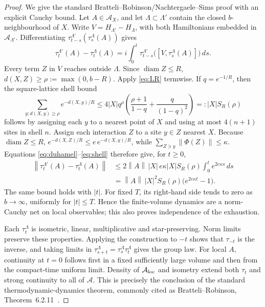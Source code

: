 \documentclass[11pt]{article}
\theoremstyle{remark}
\newcommand{\A}{\mathcal A}
\newcommand{\diam}{\operatorname{diam}}
\newcommand{\norm}[1]{\left\lVert#1\right\rVert}
\begin{document}
\begin{proof}
We give the standard Bratteli--Robinson/Nachtergaele--Sims proof with an
explicit Cauchy bound.  Let \(A\in\A_X\), and let
\(\Lambda\subset\Lambda'\) contain the closed \(b\)-neighbourhood of \(X\).
Write \(V=H_{\Lambda'}-H_\Lambda\), with both Hamiltonians embedded in
\(\A_{\Lambda'}\).  Differentiating
\(\tau_{t-s}^{\Lambda'}(\tau_s^\Lambda(A))\) gives
\[
 \tau_t^{\Lambda'}(A)-\tau_t^\Lambda(A)
 =i\int_0^t
 \tau_{t-s}^{\Lambda'}
 \bigl([V,\tau_s^\Lambda(A)]\bigr)\,ds.
\tag{3.2}\label{eq:duhamel}
\]
Every term \(Z\) in \(V\) reaches outside \(\Lambda\).  Since
\(\diam Z\leq R\), \(d(X,Z)\geq\rho:=\max(0,b-R)\).
Apply \eqref{eq:LR} termwise.  If \(q=e^{-1/R}\), then the square-lattice
shell bound
\[
 \sum_{y:d(X,y)\geq\rho}e^{-d(X,y)/R}
 \leq
 4|X|q^\rho
 \left(\frac{\rho+1}{1-q}+\frac{q}{(1-q)^2}\right)
 =:|X|S_R(\rho)
\tag{3.3}\label{eq:shell}
\]
follows by assigning each \(y\) to a nearest point of \(X\) and using at
most \(4(n+1)\) sites in shell \(n\).  Assign each interaction \(Z\) to a
site \(y\in Z\) nearest \(X\).  Because \(\diam Z\leq R\),
\(e^{-d(X,Z)/R}\leq e\,e^{-d(X,y)/R}\), while
\(\sum_{Z\ni y}\norm{\Phi(Z)}\leq\kappa\).  Equations
\eqref{eq:duhamel}--\eqref{eq:shell} therefore give, for \(t\geq0\),
\[
\begin{aligned}
 \norm{\tau_t^{\Lambda'}(A)-\tau_t^\Lambda(A)}
 &\leq
 2\norm A\,|X|\,e\kappa |X|S_R(\rho)
 \int_0^t e^{2e\kappa s}\,ds\\
 &=\norm A\,|X|^2S_R(\rho)
 \bigl(e^{2e\kappa t}-1\bigr).
\end{aligned}
\tag{3.4}\label{eq:convergence}
\]
The same bound holds with \(|t|\).  For fixed \(T\), its right-hand side
tends to zero as \(b\to\infty\), uniformly for \(|t|\leq T\).  Hence the
finite-volume dynamics are a norm-Cauchy net on local observables; this
also proves independence of the exhaustion.

Each \(\tau_t^\Lambda\) is isometric, linear, multiplicative and
star-preserving.  Norm limits preserve these properties.
Applying the construction to \(-t\) shows that \(\tau_{-t}\) is the
inverse, and taking limits in
\(\tau_{s+t}^\Lambda=\tau_s^\Lambda\tau_t^\Lambda\) gives the group law.
For local \(A\), continuity at \(t=0\) follows first in a fixed sufficiently
large volume and then from the compact-time uniform limit.  Density of
\(\A_{\rm loc}\) and isometry extend both \(\tau_t\) and strong continuity
to all of \(\A\).  This is precisely the conclusion of the standard
thermodynamic-dynamics theorem, commonly cited as
Bratteli--Robinson, Theorem~6.2.11~\cite{BR}.
\end{proof}
\end{document}
